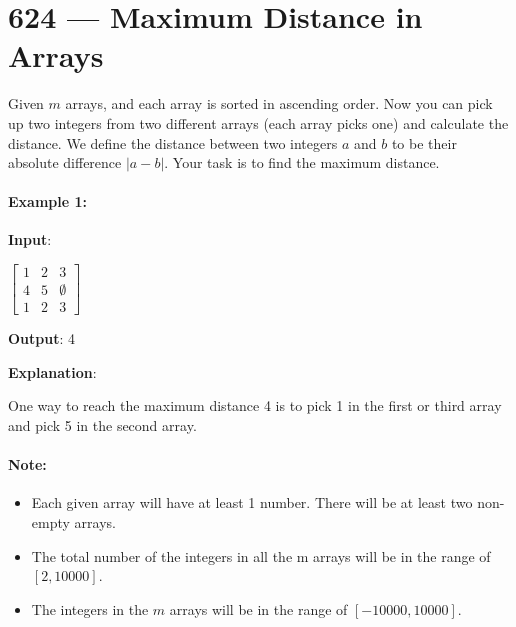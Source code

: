 \section{624 --- Maximum Distance in Arrays}
Given $m$ arrays, and each array is sorted in ascending order. Now you can pick up two integers from two different arrays (each array picks one) and calculate the distance. We define the distance between two integers $a$ and $b$ to be their absolute difference $\lvert a-b\rvert$. Your task is to find the maximum distance.

\paragraph{Example 1:}

\begin{flushleft}
\textbf{Input}:

$\begin{bmatrix}
1 & 2 & 3\\
4 & 5 & \emptyset\\
1 & 2 & 3
\end{bmatrix}$

\textbf{Output}: 4

\textbf{Explanation}:
 
One way to reach the maximum distance 4 is to pick 1 in the first or third array and pick 5 in the second array.
\end{flushleft}

\paragraph{Note:}

\begin{itemize}
\item Each given array will have at least 1 number. There will be at least two non-empty arrays.
\item The total number of the integers in all the m arrays will be in the range of $[2, 10000]$.
\item The integers in the $m$ arrays will be in the range of $[-10000, 10000]$.
\end{itemize}

